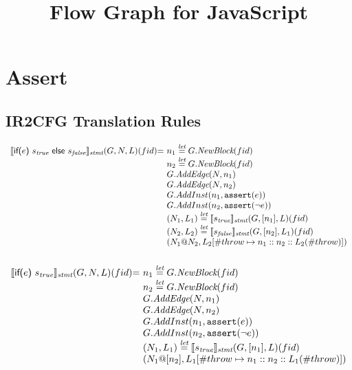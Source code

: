 \documentclass{article}
\title{Flow Graph for JavaScript}
\newcommand{\lbr}{\ensuremath{\llbracket}}
\newcommand{\rbr}{\ensuremath{\rrbracket}}
\newcommand{\TT}[1]{\mbox{\texttt{#1}}}
\newcommand{\transfun}[1]{\ensuremath{\lbr #1 \rbr}}
\newcommand{\irifelse}[3]{\textsf{if(} #1 \textsf{)}\ #2\ \textsf{else}\ #3}
\newcommand{\ircfgif}[2]{\textsf{if(} #1 \textsf{)}\ #2}
\newcommand{\letval}{\overset{\emph{let}}{=}}
\begin{document}
\section{Assert}
\subsection{IR2CFG Translation Rules}
\[
\begin{array}{l@{}l@{~}l}
\transfun{\irifelse{e}{s_{\emph{true}}}{s_{\emph{false}}}}_{\emph{stmt}}(G,N,L)(fid) & = &
	n_1 \letval G.\emph{NewBlock}(fid)\\
	& & n_2 \letval G.\emph{NewBlock}(fid)\\
	& & G.\emph{AddEdge}(N,n_1)\\
	& & G.\emph{AddEdge}(N,n_2)\\
	& & G.AddInst(n_1, \TT{assert}(e))\\
	& & G.AddInst(n_2, \TT{assert}(\neg e))\\
	& & (N_1,L_1) \letval \transfun{s_{\emph{true}}}_{\emph{stmt}}(G,[n_1],L)(fid)\\
	& & (N_2,L_2) \letval \transfun{s_{\emph{false}}}_{\emph{stmt}}(G,[n_2],L_1)(fid)\\
	& & (N_1@N_2,L_2[\#throw \mapsto n_1::n_2::L_2(\#throw)])\\
	& & \\
\end{array}
\]
\[
\begin{array}{l@{}l@{~}l}
\transfun{\ircfgif{e}{s_{\emph{true}}}{}}_{\emph{stmt}}(G,N,L)(fid) & = &
	n_1 \letval G.\emph{NewBlock}(fid)\\
	& & n_2 \letval G.\emph{NewBlock}(fid)\\
	& & G.\emph{AddEdge}(N,n_1)\\
	& & G.\emph{AddEdge}(N,n_2)\\
	& & G.AddInst(n_1, \TT{assert}(e))\\
	& & G.AddInst(n_2, \TT{assert}(\neg e))\\
	& & (N_1,L_1) \letval \transfun{s_{\emph{true}}}_{\emph{stmt}}(G,[n_1],L)(fid)\\
	& & (N_1@[n_2],L_1[\#throw \mapsto n_1::n_2::L_1(\#throw)])\\
	& & \\
	
\end{array}
\]
\end{document}
